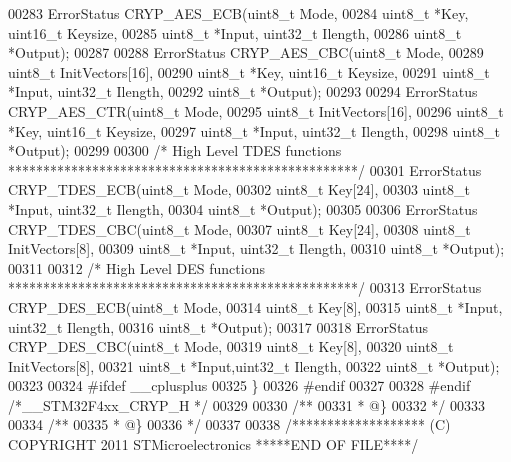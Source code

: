 \begin{DoxyCode}
00283 ErrorStatus CRYP_AES_ECB(uint8\_t Mode,
00284                          uint8\_t *Key, uint16\_t Keysize,
00285                          uint8\_t *Input, uint32\_t Ilength,
00286                          uint8\_t *Output);
00287 
00288 ErrorStatus CRYP_AES_CBC(uint8\_t Mode,
00289                          uint8\_t InitVectors[16],
00290                          uint8\_t *Key, uint16\_t Keysize,
00291                          uint8\_t *Input, uint32\_t Ilength,
00292                          uint8\_t *Output);
00293 
00294 ErrorStatus CRYP_AES_CTR(uint8\_t Mode,
00295                          uint8\_t InitVectors[16],
00296                          uint8\_t *Key, uint16\_t Keysize,
00297                          uint8\_t *Input, uint32\_t Ilength,
00298                          uint8\_t *Output);
00299 
00300 \textcolor{comment}{/* High Level TDES functions **************************************************/}
00301 ErrorStatus CRYP_TDES_ECB(uint8\_t Mode,
00302                            uint8\_t Key[24],
00303                            uint8\_t *Input, uint32\_t Ilength,
00304                            uint8\_t *Output);
00305 
00306 ErrorStatus CRYP_TDES_CBC(uint8\_t Mode,
00307                           uint8\_t Key[24],
00308                           uint8\_t InitVectors[8],
00309                           uint8\_t *Input, uint32\_t Ilength,
00310                           uint8\_t *Output);
00311 
00312 \textcolor{comment}{/* High Level DES functions **************************************************/}
00313 ErrorStatus CRYP_DES_ECB(uint8\_t Mode,
00314                          uint8\_t Key[8],
00315                          uint8\_t *Input, uint32\_t Ilength,
00316                          uint8\_t *Output);
00317 
00318 ErrorStatus CRYP_DES_CBC(uint8\_t Mode,
00319                          uint8\_t Key[8],
00320                          uint8\_t InitVectors[8],
00321                          uint8\_t *Input,uint32\_t Ilength,
00322                          uint8\_t *Output);
00323 
00324 \textcolor{preprocessor}{#}\textcolor{preprocessor}{ifdef} \_\_cplusplus
00325 \}
00326 \textcolor{preprocessor}{#}\textcolor{preprocessor}{endif}
00327 
00328 \textcolor{preprocessor}{#}\textcolor{preprocessor}{endif} \textcolor{comment}{/*\_\_STM32F4xx\_CRYP\_H */}
00329 
00330 \textcolor{comment}{/**}
00331 \textcolor{comment}{  * @\}}
00332 \textcolor{comment}{  */}
00333 
00334 \textcolor{comment}{/**}
00335 \textcolor{comment}{  * @\}}
00336 \textcolor{comment}{  */}
00337 
00338 \textcolor{comment}{/******************* (C) COPYRIGHT 2011 STMicroelectronics *****END OF FILE****/}
\end{DoxyCode}
